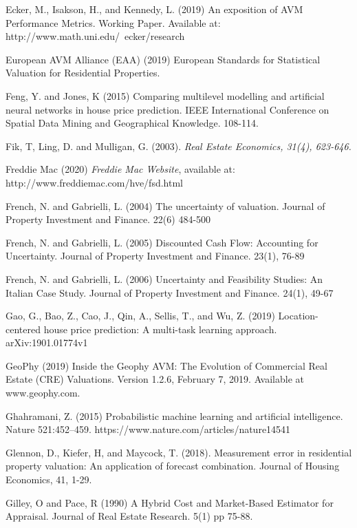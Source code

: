 \documentclass[colTwo]{anon}
\theoremstyle{definition}
\begin{document}
\begin{thebibliography}{50}
\harvarditem{}{}{}Ecker, M., Isakson, H., and Kennedy, L. (2019) An exposition of AVM Performance Metrics.  Working Paper.  Available at: http://www.math.uni.edu/~ecker/research

\harvarditem{}{}{}European AVM Alliance (EAA) (2019) European Standards for Statistical Valuation for Residential Properties. 

\harvarditem{}{}{}Feng, Y. and Jones, K (2015) Comparing multilevel modelling and artificial neural networks in house price prediction. IEEE International Conference on Spatial Data Mining and Geographical Knowledge. 108-114.

\harvarditem{}{}{}Fik, T, Ling, D. and Mulligan, G. (2003). \it{Real Estate Economics}, 31(4), 623-646. 

\harvarditem{}{}{}Freddie Mac (2020) \textit{Freddie Mac Website}, available at: http://www.freddiemac.com/hve/fsd.html

\harvarditem{}{}{}French, N. and Gabrielli, L. (2004) The uncertainty of valuation.  Journal of Property Investment and Finance. 22(6) 484-500

\harvarditem{}{}{}French, N. and Gabrielli, L. (2005) Discounted Cash Flow: Accounting for Uncertainty.  Journal of Property Investment and Finance. 23(1), 76-89

\harvarditem{}{}{}French, N. and Gabrielli, L. (2006) Uncertainty and Feasibility Studies: An Italian Case Study.  Journal of Property Investment and Finance. 24(1), 49-67

\harvarditem{}{}{}Gao, G., Bao, Z., Cao, J., Qin, A., Sellis, T., and Wu, Z. (2019) Location-centered house price prediction: A multi-task learning approach. arXiv:1901.01774v1

\harvarditem{}{}{}GeoPhy (2019) Inside the Geophy AVM: The Evolution of Commercial Real Estate (CRE) Valuations. Version 1.2.6, February 7, 2019.  Available at www.geophy.com. 

\harvarditem{}{}{}Ghahramani, Z. (2015) Probabilistic machine learning and artificial intelligence. Nature 521:452–459. https://www.nature.com/articles/nature14541

\harvarditem{}{}{}Glennon, D., Kiefer, H, and Maycock, T. (2018). Measurement error in residential property valuation: An application of forecast combination. Journal of Housing Economics, 41, 1-29. 

\harvarditem{}{}{}Gilley, O and Pace, R (1990) A Hybrid Cost and Market-Based Estimator for Appraisal. Journal of Real Estate Research. 5(1) pp 75-88. 


\end{thebibliography}
\end{document}

